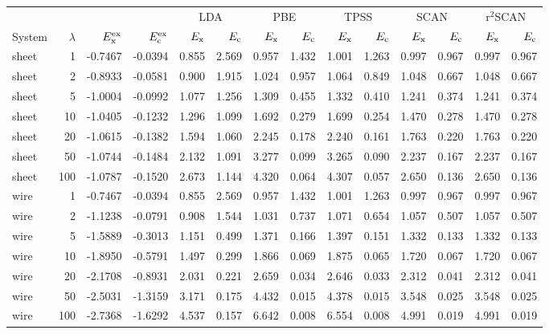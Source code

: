 \begin{tabular}{lrrrrrrrrrrrrr}
\toprule
& & & & \multicolumn{2}{c}{LDA} & \multicolumn{2}{c}{PBE} & \multicolumn{2}{c}{TPSS} & \multicolumn{2}{c}{SCAN} & \multicolumn{2}{c}{r$^2$SCAN} \\
System & $\lambda$ & $E_{\rm x}^{\rm ex}$ & $E_{\rm c}^{\rm ex}$ & $E_{\rm x}$ & $E_{\rm c}$ & $E_{\rm x}$ & $E_{\rm c}$ & $E_{\rm x}$ & $E_{\rm c}$ & $E_{\rm x}$ & $E_{\rm c}$ & $E_{\rm x}$ & $E_{\rm c}$ \\
\midrule
sheet & 1 & -0.7467 & -0.0394 & 0.855 & 2.569 & 0.957 & 1.432 & 1.001 & 1.263 & 0.997 & 0.967 & 0.997 & 0.967 \\
sheet & 2 & -0.8933 & -0.0581 & 0.900 & 1.915 & 1.024 & 0.957 & 1.064 & 0.849 & 1.048 & 0.667 & 1.048 & 0.667 \\
sheet & 5 & -1.0004 & -0.0992 & 1.077 & 1.256 & 1.309 & 0.455 & 1.332 & 0.410 & 1.241 & 0.374 & 1.241 & 0.374 \\
sheet & 10 & -1.0405 & -0.1232 & 1.296 & 1.099 & 1.692 & 0.279 & 1.699 & 0.254 & 1.470 & 0.278 & 1.470 & 0.278 \\
sheet & 20 & -1.0615 & -0.1382 & 1.594 & 1.060 & 2.245 & 0.178 & 2.240 & 0.161 & 1.763 & 0.220 & 1.763 & 0.220 \\
sheet & 50 & -1.0744 & -0.1484 & 2.132 & 1.091 & 3.277 & 0.099 & 3.265 & 0.090 & 2.237 & 0.167 & 2.237 & 0.167 \\
sheet & 100 & -1.0787 & -0.1520 & 2.673 & 1.144 & 4.320 & 0.064 & 4.307 & 0.057 & 2.650 & 0.136 & 2.650 & 0.136 \\
\midrule
wire & 1 & -0.7467 & -0.0394 & 0.855 & 2.569 & 0.957 & 1.432 & 1.001 & 1.263 & 0.997 & 0.967 & 0.997 & 0.967 \\
wire & 2 & -1.1238 & -0.0791 & 0.908 & 1.544 & 1.031 & 0.737 & 1.071 & 0.654 & 1.057 & 0.507 & 1.057 & 0.507 \\
wire & 5 & -1.5889 & -0.3013 & 1.151 & 0.499 & 1.371 & 0.166 & 1.397 & 0.151 & 1.332 & 0.133 & 1.332 & 0.133 \\
wire & 10 & -1.8950 & -0.5791 & 1.497 & 0.299 & 1.866 & 0.069 & 1.875 & 0.065 & 1.720 & 0.067 & 1.720 & 0.067 \\
wire & 20 & -2.1708 & -0.8931 & 2.031 & 0.221 & 2.659 & 0.034 & 2.646 & 0.033 & 2.312 & 0.041 & 2.312 & 0.041 \\
wire & 50 & -2.5031 & -1.3159 & 3.171 & 0.175 & 4.432 & 0.015 & 4.378 & 0.015 & 3.548 & 0.025 & 3.548 & 0.025 \\
wire & 100 & -2.7368 & -1.6292 & 4.537 & 0.157 & 6.642 & 0.008 & 6.554 & 0.008 & 4.991 & 0.019 & 4.991 & 0.019 \\
\bottomrule
\end{tabular}
